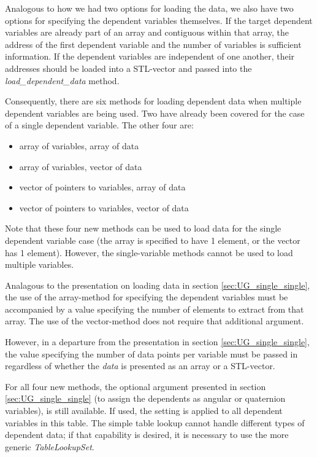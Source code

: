 \documentclass[11pt,fleqn]{report}
\begin{document}
Analogous to how we had two options for loading the data, we also have two
options for specifying the dependent variables themselves.  If the target
dependent
variables are already part of an array and contiguous within that array,
the address of the first dependent variable and the number of variables is
sufficient information.  If the dependent variables are independent of one
another, their addresses should be loaded into a STL-vector and passed into
the \textit{load\_dependent\_data} method.

Consequently, there are six methods for loading dependent data when multiple
dependent variables are being used.
Two have already been covered for the case of a single dependent
variable.  The other four are:
\begin{itemize}
 \item array of variables, array of data
 \item array of variables, vector of data
 \item vector of pointers to variables, array of data
 \item vector of pointers to variables, vector of data
\end{itemize}
Note that these four new methods can be used to load data for the
 single dependent variable case (the array is specified to have 1 element,
 or the vector has 1 element).  However, the single-variable methods
 cannot be used to load multiple variables.

Analagous to the presentation on loading data in section
\ref{sec:UG_single_single}, the use of the
array-method for specifying the dependent variables must be accompanied
by a value specifying the number of
elements to extract from that array.  The use of the vector-method does
not require that additional argument.

However, in a departure from the presentation in section
 \ref{sec:UG_single_single}, the value specifying the number of data points
 per variable must be passed in regardless of whether the \textit{data}
 is presented
 as an array or a STL-vector.

For all four new methods, the optional argument presented in section
 \ref{sec:UG_single_single} (to assign the dependents as angular or quaternion
 variables), is still available.
  If used, the setting is applied to all dependent variables in this table.
  The simple table lookup cannot handle different types of dependent data; if
  that capability is desired, it is necessary to use the more generic
  \textit{TableLookupSet}.
\end{document}
